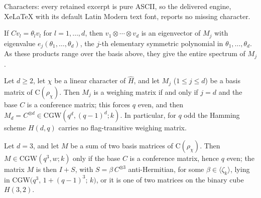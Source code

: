 \documentclass[10pt,a4paper]{amsart}
\newcommand{\CGW}{\mathrm{CGW}}
\newcommand{\Cr}{\mathrm{C}}
\begin{document}
Characters: every retained excerpt is pure ASCII, so the delivered engine, XeLaTeX with its default Latin Modern text font, reports no missing character.
\begin{lemma}\label{lem:basis-eigenvalues}
If $Cv_l=\theta_l v_l$ for $l=1,\dots,d$, then $v_1\otimes\cdots\otimes v_d$ is an
eigenvector of $M_j$ with eigenvalue $e_j(\theta_1,\dots,\theta_d)$, the $j$-th
elementary symmetric polynomial in $\theta_1,\dots,\theta_d$.  As these products
range over the basis above, they give the entire spectrum of $M_j$.
\end{lemma}

\begin{theorem}\label{thm:hamming-flag}
Let $d\geq2$, let $\chi$ be a linear character of $\widehat H$, and let $M_j$
($1\leq j\leq d$) be a basis matrix of $\Cr(\rho_\chi)$.  Then $M_j$ is a weighing
matrix if and only if $j=d$ and the base $C$ is a conference matrix; this forces
$q$ even, and then $M_d=C^{\otimes d}\in\CGW(q^d,(q-1)^d;k)$.  In particular, for
$q$ odd the Hamming scheme $H(d,q)$ carries no flag-transitive weighing matrix.
\end{theorem}

\begin{theorem}\label{thm:two-relation}
Let $d=3$, and let $M$ be a sum of two basis matrices of $\Cr(\rho_\chi)$. Then $M \in \mathrm{CGW}(q^{3},w;k)$
only if the base $C$ is a conference matrix, hence $q$ even; the matrix $M$ is then
$I+S$, with $S=\beta\,C^{\otimes3}$ anti-Hermitian, for some $\beta \in \langle \zeta_{k} \rangle$, lying in
$\CGW\bigl(q^3,\,1+(q-1)^3;\,k\bigr)$, or it is one of two matrices on the binary
cube $H(3,2)$.
\end{theorem}
\end{document}
